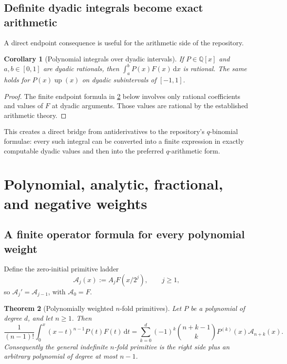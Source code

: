 \documentclass[11pt]{article}
\newtheorem{theorem}{Theorem}[section]
\newtheorem{corollary}[theorem]{Corollary}
\theoremstyle{definition}
\theoremstyle{remark}
\DeclareMathOperator{\upf}{up}
\newcommand{\dd}{\,\mathrm d}
\begin{document}
\subsection{Definite dyadic integrals become exact arithmetic}

A direct endpoint consequence is useful for the arithmetic side of the repository.

\begin{corollary}[Polynomial integrals over dyadic intervals]
If \(P\in\mathbb Q[x]\) and \(a,b\in[0,1]\) are dyadic rationals, then
\(
 \int_a^bP(x)F(x)\dd x
\)
is rational.  The same holds for \(P(x)\upf(x)\) on dyadic subintervals of
\([-1,1]\).
\end{corollary}

\begin{proof}
The finite endpoint formula in \cref{thm:polynomial-primitive} below involves only
rational coefficients and values of \(F\) at dyadic arguments.  Those values are
rational by the established arithmetic theory.
\end{proof}

This creates a direct bridge from antiderivatives to the repository's
\(q\)-binomial formulae: every such integral can be converted into a finite expression
in exactly computable dyadic values and then into the preferred \(q\)-arithmetic form.

\section{Polynomial, analytic, fractional, and negative weights}

\subsection{A finite operator formula for every polynomial weight}

Define the zero-initial primitive ladder
\begin{equation}
 \mathcal A_j(x):=A_jF(x/2^j),\qquad j\ge1,                \label{eq:Aj-ladder}
\end{equation}
so \(\mathcal A_j'=\mathcal A_{j-1}\), with
\(\mathcal A_0=F\).

\begin{theorem}[Polynomially weighted \(n\)-fold primitives]
\label{thm:polynomial-primitive}
Let \(P\) be a polynomial of degree \(d\), and let \(n\ge1\).  Then
\begin{equation}
 \boxed{
 \frac1{(n-1)!}\int_0^x(x-t)^{n-1}P(t)F(t)\dd t
 =\sum_{k=0}^{d}(-1)^k\binom{n+k-1}{k}
   P^{(k)}(x)\mathcal A_{n+k}(x).
 }                                                        \label{eq:poly-nfold}
\end{equation}
Consequently the general indefinite \(n\)-fold primitive is the right side plus an
arbitrary polynomial of degree at most \(n-1\).
\end{theorem}
\end{document}
